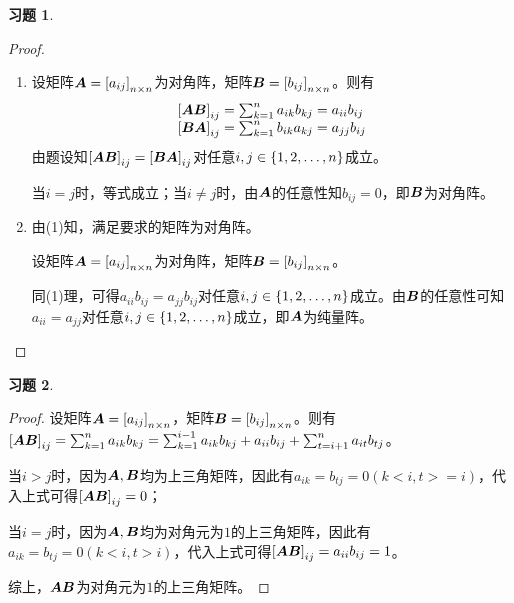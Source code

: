 \documentclass{ctexart}
\newtheorem{problem}{习题}[section]
\begin{document}
\begin{problem}
\end{problem}
\begin{proof}
    \begin{enumerate}
        \item
              {
              设矩阵\(\boldsymbol{A}=\left[ a_{ij} \right]_{n\times n}\)为对角阵，矩阵\(\boldsymbol{B}=\left[ b_{ij} \right]_{n\times n}\)。则有
              \begin{equation*}
                  \begin{array}{lll}
                      \left[ \boldsymbol{A}\boldsymbol{B} \right]_{ij}=\sum_{k=1}^na_{ik}b_{kj}=a_{ii}b_{ij} \\
                      \left[ \boldsymbol{B}\boldsymbol{A} \right]_{ij}=\sum_{k=1}^nb_{ik}a_{kj}=a_{jj}b_{ij}
                  \end{array}
              \end{equation*}
              由题设知\(\left[ \boldsymbol{A}\boldsymbol{B} \right]_{ij}=\left[ \boldsymbol{B}\boldsymbol{A} \right]_{ij}\)对任意\(i,j\in\left\{1,2,\dots,n \right\}\)成立。

              当\(i=j\)时，等式成立；当\(i\neq j\)时，由\(\boldsymbol{A}\)的任意性知\(b_{ij}=0\)，即\(\boldsymbol{B}\)为对角阵。
              }
        \item
              {
              由(1)知，满足要求的矩阵为对角阵。

              设矩阵\(\boldsymbol{A}=\left[ a_{ij} \right]_{n\times n}\)为对角阵，矩阵\(\boldsymbol{B}=\left[ b_{ij} \right]_{n\times n}\)。

              同(1)理，可得\(a_{ii}b_{ij}=a_{jj}b_{ij}\)对任意\(i,j\in\left\{1,2,\dots,n \right\}\)成立。由\(\boldsymbol{B}\)的任意性可知\(a_{ii}=a_{jj}\)对任意\(i,j\in\left\{1,2,\dots,n \right\}\)成立，即\(\boldsymbol{A}\)为纯量阵。
              }
    \end{enumerate}
\end{proof}

\begin{problem}
\end{problem}
\begin{proof}
    设矩阵\(\boldsymbol{A}=\left[ a_{ij} \right]_{n\times n}\)，矩阵\(\boldsymbol{B}=\left[ b_{ij} \right]_{n\times n}\)。则有\(\left[ \boldsymbol{A}\boldsymbol{B} \right]_{ij}=\sum_{k=1}^na_{ik}b_{kj}=\sum_{k=1}^{i-1}a_{ik}b_{kj}+a_{ii}b_{ij}+\sum_{t=i+1}^na_{it}b_{tj}\)。

    当\(i>j\)时，因为\(\boldsymbol{A},\boldsymbol{B}\)均为上三角矩阵，因此有\(a_{ik}=b_{tj}=0(k<i,t>=i)\)，代入上式可得\(\left[ \boldsymbol{A}\boldsymbol{B} \right]_{ij}=0\)；

    当\(i=j\)时，因为\(\boldsymbol{A},\boldsymbol{B}\)均为对角元为\(1\)的上三角矩阵，因此有\(a_{ik}=b_{tj}=0(k<i,t>i)\)，代入上式可得\(\left[ \boldsymbol{A}\boldsymbol{B} \right]_{ij}=a_{ii}b_{ij}=1\)。

    综上，\(\boldsymbol{A}\boldsymbol{B}\)为对角元为\(1\)的上三角矩阵。
\end{proof}
\end{document}
